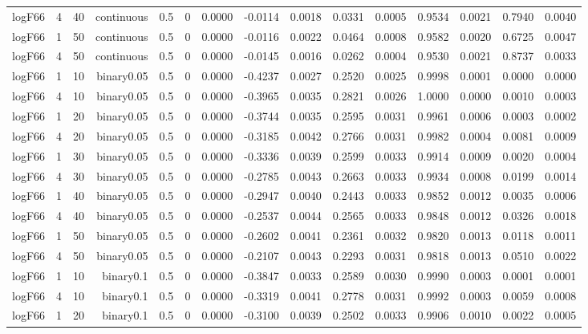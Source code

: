 \begin{longtable}{rrrrrrrrrrrrrrr}
  logF66 & 4 & 40 & continuous & 0.5 & 0 & 0.0000 & -0.0114 & 0.0018 & 0.0331 & 0.0005 & 0.9534 & 0.0021 & 0.7940 & 0.0040 \\ 
  logF66 & 1 & 50 & continuous & 0.5 & 0 & 0.0000 & -0.0116 & 0.0022 & 0.0464 & 0.0008 & 0.9582 & 0.0020 & 0.6725 & 0.0047 \\ 
  logF66 & 4 & 50 & continuous & 0.5 & 0 & 0.0000 & -0.0145 & 0.0016 & 0.0262 & 0.0004 & 0.9530 & 0.0021 & 0.8737 & 0.0033 \\ 
  logF66 & 1 & 10 & binary0.05 & 0.5 & 0 & 0.0000 & -0.4237 & 0.0027 & 0.2520 & 0.0025 & 0.9998 & 0.0001 & 0.0000 & 0.0000 \\ 
  logF66 & 4 & 10 & binary0.05 & 0.5 & 0 & 0.0000 & -0.3965 & 0.0035 & 0.2821 & 0.0026 & 1.0000 & 0.0000 & 0.0010 & 0.0003 \\ 
  logF66 & 1 & 20 & binary0.05 & 0.5 & 0 & 0.0000 & -0.3744 & 0.0035 & 0.2595 & 0.0031 & 0.9961 & 0.0006 & 0.0003 & 0.0002 \\ 
  logF66 & 4 & 20 & binary0.05 & 0.5 & 0 & 0.0000 & -0.3185 & 0.0042 & 0.2766 & 0.0031 & 0.9982 & 0.0004 & 0.0081 & 0.0009 \\ 
  logF66 & 1 & 30 & binary0.05 & 0.5 & 0 & 0.0000 & -0.3336 & 0.0039 & 0.2599 & 0.0033 & 0.9914 & 0.0009 & 0.0020 & 0.0004 \\ 
  logF66 & 4 & 30 & binary0.05 & 0.5 & 0 & 0.0000 & -0.2785 & 0.0043 & 0.2663 & 0.0033 & 0.9934 & 0.0008 & 0.0199 & 0.0014 \\ 
  logF66 & 1 & 40 & binary0.05 & 0.5 & 0 & 0.0000 & -0.2947 & 0.0040 & 0.2443 & 0.0033 & 0.9852 & 0.0012 & 0.0035 & 0.0006 \\ 
  logF66 & 4 & 40 & binary0.05 & 0.5 & 0 & 0.0000 & -0.2537 & 0.0044 & 0.2565 & 0.0033 & 0.9848 & 0.0012 & 0.0326 & 0.0018 \\ 
  logF66 & 1 & 50 & binary0.05 & 0.5 & 0 & 0.0000 & -0.2602 & 0.0041 & 0.2361 & 0.0032 & 0.9820 & 0.0013 & 0.0118 & 0.0011 \\ 
  logF66 & 4 & 50 & binary0.05 & 0.5 & 0 & 0.0000 & -0.2107 & 0.0043 & 0.2293 & 0.0031 & 0.9818 & 0.0013 & 0.0510 & 0.0022 \\ 
  logF66 & 1 & 10 & binary0.1 & 0.5 & 0 & 0.0000 & -0.3847 & 0.0033 & 0.2589 & 0.0030 & 0.9990 & 0.0003 & 0.0001 & 0.0001 \\ 
  logF66 & 4 & 10 & binary0.1 & 0.5 & 0 & 0.0000 & -0.3319 & 0.0041 & 0.2778 & 0.0031 & 0.9992 & 0.0003 & 0.0059 & 0.0008 \\ 
  logF66 & 1 & 20 & binary0.1 & 0.5 & 0 & 0.0000 & -0.3100 & 0.0039 & 0.2502 & 0.0033 & 0.9906 & 0.0010 & 0.0022 & 0.0005 \\ 

\end{longtable}
